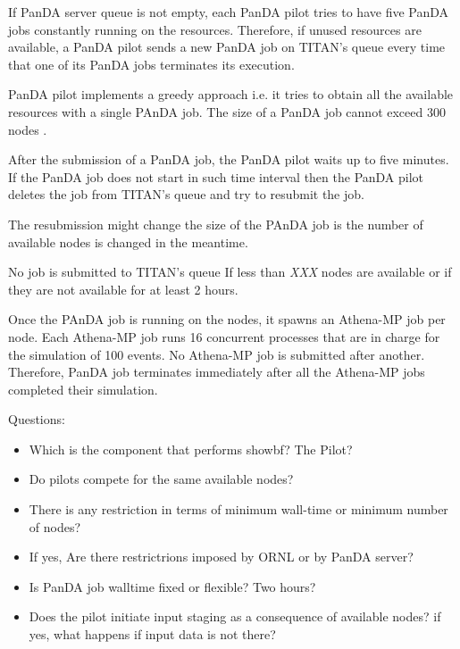 If PanDA server queue is not empty, each PanDA pilot tries to have five PanDA jobs constantly running on the resources. Therefore, if unused resources are available, a PanDA pilot sends a new PanDA job on TITAN's queue every time that one of its PanDA jobs terminates its execution.

PanDA pilot implements a greedy approach i.e. it tries to obtain all the available resources with a single PAnDA job. The size of a PanDA job cannot exceed 300 nodes .

After the submission of a PanDA job,  the PanDA pilot waits up to five minutes. If the PanDA job does not start in such time interval then the PanDA pilot deletes the job from TITAN's queue and try to resubmit the job.

The resubmission might change the size of the PAnDA job is the number of available nodes is changed in the meantime.

No job is submitted to TITAN's queue If less than \emph{XXX} nodes are available or if they are not  available for at least 2 hours.

Once the PAnDA job is running on the nodes, it spawns an Athena-MP job per node. Each Athena-MP job runs 16 concurrent processes that are in charge for the simulation of 100 events. No Athena-MP job is submitted after another. Therefore, PanDA job terminates immediately after all the Athena-MP jobs completed their simulation.

Questions:
\begin{itemize}
\item Which is the component that performs showbf? The Pilot?
\item Do pilots compete for the same available nodes?
\item There is any restriction in terms of minimum wall-time or minimum number of nodes?
\item If yes, Are there restrictrions imposed by ORNL or by PanDA server?
\item Is PanDA job walltime fixed or flexible? Two hours?
\item Does the pilot initiate input staging as a consequence of available nodes? if yes, what happens if input data is not there?
\end{itemize}
